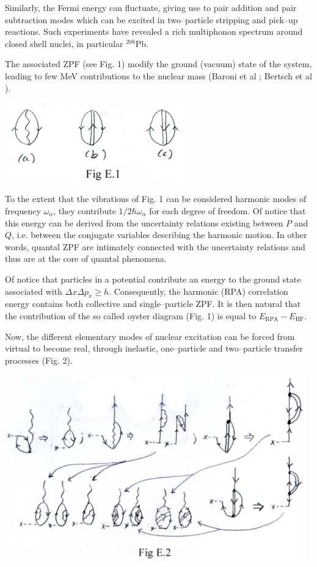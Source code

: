 \documentclass[a4paper,onecolumn,superscriptaddress,12pt,nofootinbib,twoside,raggedfooter,notitlepage]{revtex4-1}
\begin{document}
Similarly, the Fermi energy can fluctuate, giving use to pair addition and pair subtraction modes which can be excited in two--particle stripping and pick--up reactions. Such experiments have revealed a rich multiphonon spectrum around closed shell nuclei, in particular ${}^{208}$Pb.

The associated ZPF (see Fig. 1) modify the ground (vacuum) state of the system, leading to few MeV contributions to the nuclear mass (Baroni et al \qquad; Bertsch et al \qquad).
\begin{center}
	\includegraphics[width=0.58\textwidth]{figs/fig_e1}
\end{center}
To the extent that the vibrations of Fig. 1  can be considered harmonic modes of frequency $\omega_\alpha$, they contribute $1/2 \hbar \omega_\alpha$ for each degree of freedom. Of notice that this energy can be derived from the uncertainty relations existing between $P$ and $Q$, i.e. between the conjugate variables describing the harmonic motion. In other words, quantal ZPF are intimately connected with the uncertainty relations and thus are at the core of quantal phenomena.

Of notice that particles in a potential contribute an energy to the ground state associated with $\Delta x \Delta p_x \geq h$. Consequently, the harmonic (RPA) correlation energy contains both collective and single--particle ZPF. It is then natural that the contribution of the so called oyster diagram (Fig. 1) is equal to $E_\textrm{RPA} - E_\textrm{HF}$.

Now, the different elementary modes of nuclear excitation can be forced from virtual to become real, through inelastic, one--particle and two--particle transfer processes (Fig. 2).
\begin{center}
	\includegraphics[width=0.98\textwidth]{figs/fig_e2}
\end{center}
\end{document}
